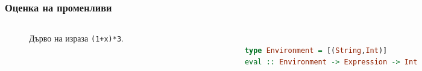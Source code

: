 \documentclass{beamer}
\begin{document}
\begin{frame}[fragile]
  \frametitle{Оценка на променливи}


\begin{columns}[t]
  \begin{column}{0.3\textwidth}

    \begin{figure}
      \centering
      \caption{Дърво на израза \texttt{(1+x)*3}.}
      \label{fig:treeexpr}
      \end{figure}
      

  \end{column}
  \begin{column}{0.7\textwidth}

\begin{lstlisting}[basicstyle=\small,language=Haskell]

type Environment = [(String,Int)]
eval :: Environment -> Expression -> Int     

\end{lstlisting}

  \end{column}
\end{columns}

\end{frame}  
\end{document}
